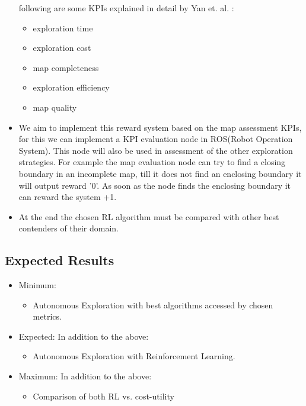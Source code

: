 \begin{itemize}
following are some KPIs explained in detail by Yan et. al. :
\begin{itemize}
  \item exploration time
  \item exploration cost
  \item map completeness
  \item exploration efficiency
  \item map quality
\end{itemize}

\item We aim to implement this reward system based on the map assessment KPIs, for this we can
implement a KPI evaluation node in ROS(Robot Operation System). This node will also be used in
assessment of the other exploration strategies. For example the map evaluation node can try to find
a closing boundary in an incomplete map, till it does not find an enclosing boundary it will output
reward '0'. As soon as the node finds the enclosing boundary it can reward the system +1.

\item At the end the chosen RL algorithm must be compared with other best contenders of their domain.
\end{itemize}


\subsection{Expected Results}
\begin{itemize}
	\item Minimum:
	\begin{itemize}
		\item Autonomous Exploration with best algorithms accessed by chosen metrics.
	\end{itemize}
	\item Expected:
	In addition to the above:
	\begin{itemize}
		\item Autonomous Exploration with Reinforcement Learning.
	\end{itemize}
	\item Maximum:
	In addition to the above:
	\begin{itemize}
		\item Comparison of both RL vs. cost-utility
	\end{itemize}
\end{itemize}
